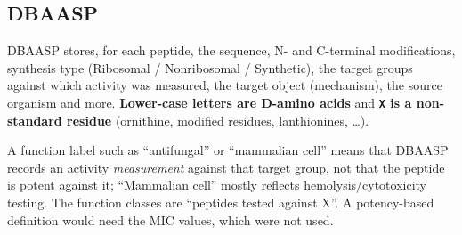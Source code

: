 \documentclass[11pt,a4paper]{article}
\begin{document}
\subsection{DBAASP}
DBAASP \cite{pirtskhalava2021} stores, for each peptide, the sequence, N- and C-terminal modifications, synthesis type (Ribosomal / Nonribosomal / Synthetic),
the target groups against which activity was measured, the target object (mechanism), the source organism and more.
\textbf{Lower-case letters are D-amino acids} and \textbf{\texttt{X} is a non-standard residue} (ornithine, modified residues, lanthionines, \dots).

\begin{caution}
A function label such as ``antifungal'' or ``mammalian cell'' means that DBAASP records an activity \emph{measurement} against that target group,
not that the peptide is potent against it; ``Mammalian cell'' mostly reflects hemolysis/cytotoxicity testing. The function classes are ``peptides tested against X''.
A potency-based definition would need the MIC values, which were not used.
\end{caution}
\end{document}
